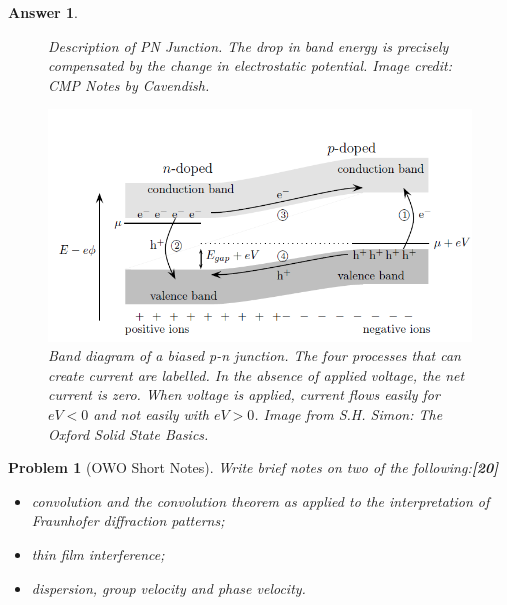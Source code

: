 \documentclass[a4paper]{article}
\newtheorem{ans}{Answer}[subsection]
\theoremstyle{new}
\newtheorem{qns}{Problem}[subsection]
\begin{document}
\begin{ans}
\begin{figure}[H]
    \caption{Description of PN Junction. The drop in band energy is precisely compensated by the change in electrostatic potential. Image credit: CMP Notes by Cavendish.}
\end{figure}
\begin{figure}[H]
    \centering
    \includegraphics[width=\linewidth]{biasedPN.PNG}
    \caption{Band diagram of a biased p-n junction. The four processes that can create current are labelled. In the absence of applied voltage, the net current is zero. When voltage is applied, current flows easily for $eV<0$ and not easily with $eV>0$. Image from S.H. Simon: The Oxford Solid State Basics. }
\end{figure}
\end{ans}
\newpage
\begin{qns}[OWO Short Notes]
Write brief notes on two of the following:\hfill\textbf{[20]}
\begin{itemize}
    \item convolution and the convolution theorem as applied to the interpretation of Fraunhofer diffraction patterns;
    \item thin film interference;
    \item dispersion, group velocity and phase velocity.
\end{itemize}
\end{qns}
\end{document}
